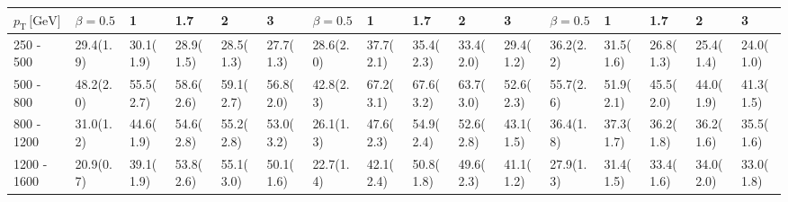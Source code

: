 \begin{table}
{\begin{tabular}{llllllllllllllll}
\multicolumn{1}{l||}{$p_{\mathrm{T}} \, \text{[GeV]}$}   &  \multicolumn{1}{l|}{  $\beta=0.5$} & \multicolumn{1}{l|}{ 1} & \multicolumn{1}{l|}{1.7} &   \multicolumn{1}{l|}{ 2} &  \multicolumn{1}{l||}{ 3} & \multicolumn{1}{l|}{ $\beta=0.5$} &  \multicolumn{1}{l|}{ 1} & 	\multicolumn{1}{l|}{ 1.7} & 	\multicolumn{1}{l|}{ 2} & \multicolumn{1}{l||}{ 3} & \multicolumn{1}{l|}{  $\beta=0.5$} & \multicolumn{1}{l|}{ 1} & \multicolumn{1}{l|}{ 1.7} &  \multicolumn{1}{l|}{ 2} & \multicolumn{1}{l|}{ 3} \\ \hline \hline
\multicolumn{1}{l||}{250 - 500} & 	\multicolumn{1}{l|}{29.4(1.9)} & \multicolumn{1}{l|}{30.1(1.9)} & \multicolumn{1}{l|}{28.9(1.5)} & 				     	\multicolumn{1}{l|}{28.5(1.3)} & 						\multicolumn{1}{l||}{27.7(1.3)} & \multicolumn{1}{l|}{28.6(2.0)} & \multicolumn{1}{l|}{37.7(2.1)} & 		\multicolumn{1}{l|}{35.4(2.3)} & 					\multicolumn{1}{l|}{33.4(2.0)} & 	\multicolumn{1}{l||}{29.4(1.2)} & 					\multicolumn{1}{l|}{36.2(2.2)} & 	\multicolumn{1}{l|}{31.5(1.6)} & \multicolumn{1}{l|}{26.8(1.3)} & \multicolumn{1}{l|}{25.4(1.4)} & \multicolumn{1}{l|}{24.0(1.0)} \\
\multicolumn{1}{l||}{500 - 800} & 	\multicolumn{1}{l|}{48.2(2.0)} & \multicolumn{1}{l|}{55.5(2.7)} & \multicolumn{1}{l|}{58.6(2.6)} & 				     	\multicolumn{1}{l|}{59.1(2.7)} & 						\multicolumn{1}{l||}{56.8(2.0)} & \multicolumn{1}{l|}{42.8(2.3)} & \multicolumn{1}{l|}{67.2(3.1)} & 						\multicolumn{1}{l|}{67.6(3.2)} & 	\multicolumn{1}{l|}{63.7(3.0)} & 	\multicolumn{1}{l||}{52.6(2.3)} & 					\multicolumn{1}{l|}{55.7(2.6)} & 	\multicolumn{1}{l|}{51.9(2.1)} & \multicolumn{1}{l|}{45.5(2.0)} & \multicolumn{1}{l|}{44.0(1.9)} & \multicolumn{1}{l|}{41.3(1.5)} \\
\multicolumn{1}{l||}{800 - 1200} & 	\multicolumn{1}{l|}{31.0(1.2)} & \multicolumn{1}{l|}{44.6(1.9)} & \multicolumn{1}{l|}{54.6(2.8)} & 				     	\multicolumn{1}{l|}{55.2(2.8)} & 		\multicolumn{1}{l||}{53.0(3.2)} & \multicolumn{1}{l|}{26.1(1.3)} & \multicolumn{1}{l|}{47.6(2.3)} & 						\multicolumn{1}{l|}{54.9(2.4)} & 					\multicolumn{1}{l|}{52.6(2.8)} & 	\multicolumn{1}{l||}{43.1(1.5)} & 					\multicolumn{1}{l|}{36.4(1.8)} & 	\multicolumn{1}{l|}{37.3(1.7)} & \multicolumn{1}{l|}{36.2(1.8)} & \multicolumn{1}{l|}{36.2(1.6)} & \multicolumn{1}{l|}{35.5(1.6)} \\
\multicolumn{1}{l||}{1200 - 1600} & \multicolumn{1}{l|}{20.9(0.7)} & \multicolumn{1}{l|}{39.1(1.9)} & \multicolumn{1}{l|}{53.8(2.6)} & 				     	\multicolumn{1}{l|}{55.1(3.0)} & 		\multicolumn{1}{l||}{50.1(1.6)} & \multicolumn{1}{l|}{22.7(1.4)} & \multicolumn{1}{l|}{42.1(2.4)} & 						\multicolumn{1}{l|}{50.8(1.8)} & 					\multicolumn{1}{l|}{49.6(2.3)} & 	\multicolumn{1}{l||}{41.1(1.2)} & 					\multicolumn{1}{l|}{27.9(1.3)} & 	\multicolumn{1}{l|}{31.4(1.5)} & \multicolumn{1}{l|}{33.4(1.6)} & \multicolumn{1}{l|}{34.0(2.0)} & \multicolumn{1}{l|}{33.0(1.8)} \\

\end{tabular}}
\end{table}

